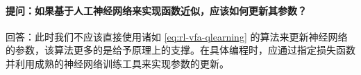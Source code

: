 \paragraph{提问：如果基于人工神经网络来实现函数近似，应该如何更新其参数？}回答：此时我们不应该直接使用诸如 \cref{eq:rl-vfa-qlearning} 的算法来更新神经网络的参数，该算法更多的是给予原理上的支撑。在具体编程时，应通过指定损失函数并利用成熟的神经网络训练工具来实现参数的更新。
